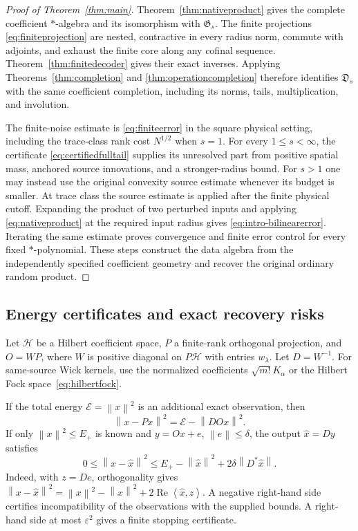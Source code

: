 \documentclass[11pt,a4paper]{amsart}
\numberwithin{equation}{section}
\theoremstyle{definition}
\theoremstyle{remark}
\newcommand{\Data}{\mathfrak D}
\newcommand{\Gaus}{\mathfrak G}
\newcommand{\norm}[1]{\left\lVert#1\right\rVert}
\newcommand{\ip}[2]{\left\langle#1,#2\right\rangle}
\begin{document}
\begin{proof}[Proof of Theorem~\ref{thm:main}]
Theorem~\ref{thm:nativeproduct} gives the complete coefficient $*$-algebra and its isomorphism with $\Gaus_s$. The finite projections \eqref{eq:finiteprojection} are nested, contractive in every radius norm, commute with adjoints, and exhaust the finite core along any cofinal sequence. Theorem~\ref{thm:finitedecoder} gives their exact inverses. Applying Theorems~\ref{thm:completion} and \ref{thm:operationcompletion} therefore identifies $\Data_s$ with the same coefficient completion, including its norms, tails, multiplication, and involution.

The finite-noise estimate is \eqref{eq:finiteerror} in the square physical setting, including the trace-class rank cost $N^{1/2}$ when $s=1$. For every $1\le s<\infty$, the certificate \eqref{eq:certifiedfulltail} supplies its unresolved part from positive spatial mass, anchored source innovations, and a stronger-radius bound. For $s>1$ one may instead use the original convexity source estimate whenever its budget is smaller. At trace class the source estimate is applied after the finite physical cutoff. Expanding the product of two perturbed inputs and applying \eqref{eq:nativeproduct} at the required input radius gives \eqref{eq:intro-bilinearerror}. Iterating the same estimate proves convergence and finite error control for every fixed $*$-polynomial. These steps construct the data algebra from the independently specified coefficient geometry and recover the original ordinary random product.
\end{proof}

\subsection{Energy certificates and exact recovery risks}
Let $\mathscr H$ be a Hilbert coefficient space, $P$ a finite-rank orthogonal projection, and $O=WP$, where $W$ is positive diagonal on $P\mathscr H$ with entries $w_\lambda$. Let $D=W^{-1}$. For same-source Wick kernels, use the normalized coefficients $\sqrt{m!}K_\alpha$ or the Hilbert Fock space~\eqref{eq:hilbertfock}.

If the total energy $\mathcal E=\norm x^2$ is an additional exact observation, then
\begin{equation}\label{eq:energytail}
 \norm{x-Px}^2=\mathcal E-\norm{DOx}^2.
\end{equation}
If only $\norm x^2\le E_+$ is known and $y=Ox+e$, $\norm e\le\delta$, the output $\widehat x=Dy$ satisfies
\begin{equation}\label{eq:posterior}
 0\le\norm{x-\widehat x}^2
 \le E_+-\norm{\widehat x}^2+2\delta\norm{D^*\widehat x}.
\end{equation}
Indeed, with $z=De$, orthogonality gives
$\norm{x-\widehat x}^2=\norm x^2-\norm{\widehat x}^2+
2\operatorname{Re}\ip{\widehat x}{z}$.
A negative right-hand side certifies incompatibility of the observations with the supplied bounds. A right-hand side at most $\varepsilon^2$ gives a finite stopping certificate.
\end{document}
